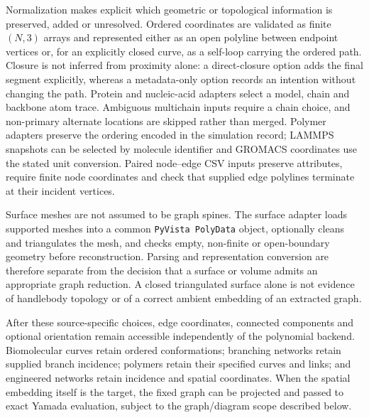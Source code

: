 Normalization makes explicit which geometric or topological information is preserved, added or unresolved. Ordered coordinates are validated as finite $(N,3)$ arrays and represented either as an open polyline between endpoint vertices or, for an explicitly closed curve, as a self-loop carrying the ordered path. Closure is not inferred from proximity alone: a direct-closure option adds the final segment explicitly, whereas a metadata-only option records an intention without changing the path. Protein and nucleic-acid adapters select a model, chain and backbone atom trace. Ambiguous multichain inputs require a chain choice, and non-primary alternate locations are skipped rather than merged. Polymer adapters preserve the ordering encoded in the simulation record; LAMMPS snapshots can be selected by molecule identifier and GROMACS coordinates use the stated unit conversion. Paired node--edge CSV inputs preserve attributes, require finite node coordinates and check that supplied edge polylines terminate at their incident vertices.

Surface meshes are not assumed to be graph spines. The surface adapter loads supported meshes into a common \texttt{PyVista PolyData} object, optionally cleans and triangulates the mesh, and checks empty, non-finite or open-boundary geometry before reconstruction. Parsing and representation conversion are therefore separate from the decision that a surface or volume admits an appropriate graph reduction. A closed triangulated surface alone is not evidence of handlebody topology or of a correct ambient embedding of an extracted graph.

After these source-specific choices, edge coordinates, connected components and optional orientation remain accessible independently of the polynomial backend. Biomolecular curves retain ordered conformations; branching networks retain supplied branch incidence; polymers retain their specified curves and links; and engineered networks retain incidence and spatial coordinates. When the spatial embedding itself is the target, the fixed graph can be projected and passed to exact Yamada evaluation, subject to the graph/diagram scope described below.

